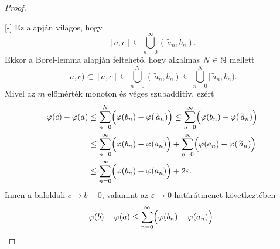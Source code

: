 \documentclass[
]{elteikthesis}[2024/04/26]
\begin{document}
\begin{proof}
{
			\vspace{-1\baselineskip}
			\label{fig:stieltjes-02}
		}[-\baselineskip]
		Ez alapján világos, hogy
		\[
			[a, c] \subseteq 
			\bigcup_{n=0}^{\infty} ( \,\widetilde{a}_n, b_n ).
		\]
		Ekkor a Borel-lemma alapján feltehető, hogy alkalmas \( N \in \mathbb{N} \) mellett
		\[
			[a, c) \subset
			[a, c] \subseteq 
			\bigcup_{n=0}^{N} ( \,\widetilde{a}_n, b_n ) \subseteq
			\bigcup_{n=0}^{N} [ \,\widetilde{a}_n, b_n ).
		\]
		Mivel az \( m \) előmérték monoton és véges szubadditív, ezért
		\marginnote{
			Itt kihasználjuk, hogy \eqref{eq:stieltjes-02} miatt a
			\[
				\sum_{n=0}^{\infty} \Bigl( \varphi(a_n) - \varphi( \, \widetilde{a}_n) \Bigr)
			\]
			sorösszegzés felső becslése
			\[
				\sum_{n=0}^{\infty} \frac{\varepsilon}{2^n} =
				\frac{\varepsilon}{1 - 1/2} =
				2\varepsilon.
			\]
		}
		\begin{align*}
			\varphi(c) - \varphi(a)
			&\leq \sum_{n=0}^{N}      \Bigl( \varphi(b_n) - \varphi(\,\widetilde{a}_n) \Bigr)
			 \leq \sum_{n=0}^{\infty} \Bigl( \varphi(b_n) - \varphi(\,\widetilde{a}_n) \Bigr) \\
			&\leq \sum_{n=0}^{\infty} \Bigl( \varphi(b_n) - \varphi(a_n) \Bigr)
			 +    \sum_{n=0}^{\infty} \Bigl( \varphi(a_n) - \varphi(\,\widetilde{a}_n) \Bigr) \\
			&\leq \sum_{n=0}^{\infty} \Bigl( \varphi(b_n) - \varphi(a_n) \Bigr)
			+     2 \varepsilon.
		\end{align*}
		Innen a baloldali \( c \to b-0 \), 
		valamint az \( \varepsilon \to 0 \) határátmenet következtében
		\[
			\varphi(b) - \varphi(a) \leq
			\sum_{n=0}^{\infty} \Bigl( \varphi(b_n) - \varphi(a_n) \Bigr).
		\]
	\end{proof}
	
\end{document}
